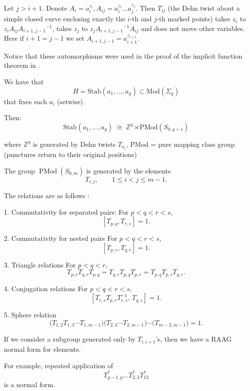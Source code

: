 \documentclass{article}
\begin{document}
Let $j>i+1$. Denote $A_i=a_i^{z_i},  A_{ij}=a_i^{z_i}\ldots a_j^{z_j}$. Then $T_{ij}$ (the Dehn twist about a simple closed curve enclosing exactly the
$i$-th and $j$-th marked points) takes $z_i$ to $z_iA_{ij}{A_{i+1,j-1}}^{-1}$, takes $z_j$ to $z_j{A_{i+1,j-1}}^{-1}A_{ij}$ and does not move other variables. Here if $i+1=j-1$ we set $A_{i+1,j-1}=a_{i+1}^{z_{i+1}}.$

Notice that these automorphisms were used in the proof of the implicit function theorem in \cite{Imp}.


We have that 
\[
H=\mathrm{Stab}(a_1,\dots,a_g)\subset \mathrm{Mod}(\Sigma_g)
\]
that fixes each \(a_i\) (setwise).

Then:
\[
\mathrm{Stab}(a_1,\dots,a_g)\;\cong\; \mathbb{Z}^g \rtimes \mathrm{PMod}(S_{0,g+1})
\]

where
\(\mathbb{Z}^g\) is generated by Dehn twists \(T_{a_i}\),
PMod = pure  mapping class group (punctures return to their original positions)



The group $\operatorname{PMod}(S_{0,m})$ is generated by the elements
\[
T_{i,j}, \qquad 1 \leq i < j \leq m-1.
\]

The relations are as follows \cite[Lemma 4.1]{GW}:



1. Commutativity for separated pairs:
For $p<q<r<s$,
\[
[T_{p,q},T_{r,s}]=1.
\]

{2. Commutativity for nested pairs}
For $p<q<r<s$,
\[
[T_{p,s},T_{q,r}]=1.
\]

{3. Triangle relations}
For $p<q<r$,
\[
T_{p,r}T_{q,r}T_{p,q}
=
T_{q,r}T_{p,q}T_{p,r}
=
T_{p,q}T_{p,r}T_{q,r}.
\]

{4. Conjugation relations}
For $p<q<r<s$,
\[
\left[ T_{r,s}T_{p,r}T_{r,s}^{-1},\, T_{q,s} \right]=1.
\]

{5. Sphere relation}
\[
\bigl(T_{1,2}T_{1,3}\cdots T_{1,m-1}\bigr)
\bigl(T_{2,3}\cdots T_{2,m-1}\bigr)
\cdots
\bigl(T_{m-2,m-1}\bigr)=1.
\]


If we consider a subgroup generated only by $T_{i,i+1}$'s, then we have a RAAG normal form for elements.

 For example, repeated application of 
$$T_{g-1,g}^{*}\ldots  T_{2,3}^{*}T_{12}^{*}$$ is a normal form.
\end{document}
